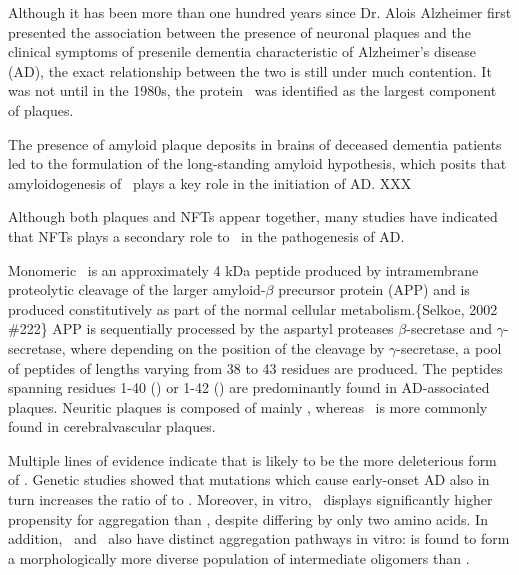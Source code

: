 Although it has been more than one hundred years since Dr. Alois Alzheimer first presented the association between the presence of neuronal plaques and the clinical symptoms of presenile dementia characteristic of Alzheimer's disease (AD), the exact relationship between the two is still under much contention.  It was not until in the 1980s, the protein \abeta\ was identified as the largest component of plaques. %

The presence of amyloid plaque deposits in brains of deceased dementia patients led to the formulation of the long-standing amyloid hypothesis, which posits that amyloidogenesis of \abeta\ plays a key role in the initiation of AD. XXX

Although both plaques and NFTs appear together, many studies have indicated that NFTs plays a secondary role to \abeta\ in the pathogenesis of AD.

Monomeric \abeta\ is an approximately 4 kDa peptide produced by intramembrane proteolytic cleavage of the larger amyloid-$\beta$ precursor protein (APP) and is produced constitutively as part of the normal cellular metabolism.\{Selkoe, 2002 \#222\} APP is sequentially processed by the aspartyl proteases $\beta$-secretase and $\gamma$-secretase, where depending on the position of the cleavage by $\gamma$-secretase, a pool of \abeta peptides of lengths varying from 38 to 43 residues are produced. The peptides spanning residues 1-40 (\abetaforty) or 1-42 (\abetafortytwo) are predominantly found in AD-associated plaques. Neuritic plaques is composed of mainly \abetafortytwo, whereas \abetaforty\ is more commonly found in cerebralvascular plaques.

Multiple lines of evidence indicate that \abetafortytwo is likely to be the more deleterious form of \abeta. Genetic studies showed that mutations which cause early-onset AD also in turn increases the ratio of \abetafortytwo to \abetaforty.\cite{Hardy:1997tu} Moreover, in vitro, \abetafortytwo\ displays significantly higher propensity for aggregation than \abetaforty, despite differing by only two amino acids. In addition, \abetaforty\ and \abetafortytwo\ also have distinct aggregation pathways in vitro: \abetafortytwo is found to form a morphologically more diverse population of intermediate oligomers than \abetaforty.\cite{Bitan:2003ut}

